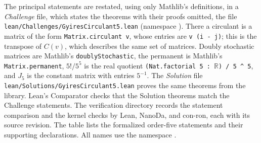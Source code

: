 \documentclass[11pt,a4paper]{article}
\theoremstyle{definition}
\theoremstyle{remark}
\newcommand{\R}{\mathbb{R}}
\begin{document}
The principal statements are restated, using only Mathlib's definitions, in a \emph{Challenge} file, which states the
theorems with their proofs omitted, the file
\texttt{lean/\allowbreak{}Challenges/\allowbreak{}GyiresCirculant5.lean} (namespace ). There a circulant is a matrix of
the form \texttt{Matrix.circulant v}, whose entries are \texttt{v (i - j)}; this is the transpose of $C(v)$, which
describes the same set of matrices. Doubly stochastic matrices are Mathlib's \texttt{doublyStochastic}, the permanent is
Mathlib's \texttt{Matrix.permanent}, $5!/5^5$ is the real quotient \texttt{(Nat.factorial 5 :\ $\R$) / 5 \textasciicircum{} 5},
and $J_5$ is the constant matrix with entries $5^{-1}$. The \emph{Solution} file
\texttt{lean/\allowbreak{}Solutions/\allowbreak{}GyiresCirculant5.lean} proves the same theorems from the library. Lean's
Comparator checks that the Solution theorems match the Challenge statements.
The verification directory records the statement comparison and the kernel checks by Lean, NanoDa, and con-ron, each with its source revision.
The table lists the formalized order-five statements and their supporting declarations. All names use the namespace .
\end{document}
